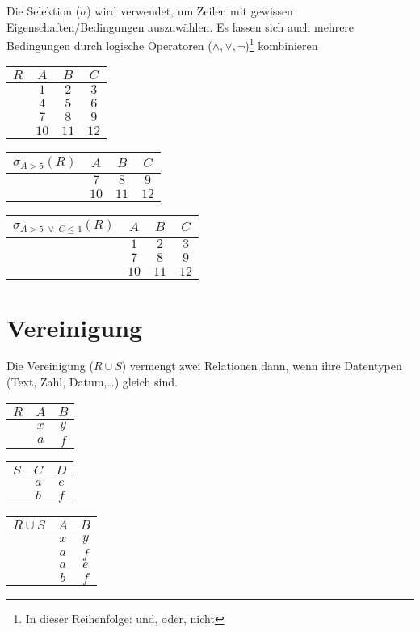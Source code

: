 \documentclass[12pt,a4paper,notitlepage,leqno]{article}
\begin{document}
Die Selektion ($\sigma$) wird verwendet, um Zeilen mit gewissen Eigenschaften/Bedingungen auszuwählen. Es lassen sich auch mehrere Bedingungen durch logische Operatoren ($\land, \lor, \neg$)\footnote{In dieser Reihenfolge: und, oder, nicht} kombinieren

\begin{center}
    \begin{tabular}{c|ccc}
        $R$ & $A$ & $B$ & $C$ \\\hline
         & $1$ & $2$ & $3$ \\
         & $4$ & $5$ & $6$ \\
         & $7$ & $8$ & $9$ \\
         & $10$ & $11$ & $12$
    \end{tabular}
    \hspace{1cm}
    \begin{tabular}{c|ccc}
        $\sigma_{A>5}(R)$ & $A$ & $B$ & $C$ \\\hline
         & $7$ & $8$ & $9$ \\
         & $10$ & $11$ & $12$
    \end{tabular}
    \hspace{1cm}
    \begin{tabular}{c|ccc}
        $\sigma_{A>5\;\lor\;C\leq 4}(R)$ & $A$ & $B$ & $C$ \\\hline
         & $1$ & $2$ & $3$ \\
         & $7$ & $8$ & $9$ \\
         & $10$ & $11$ & $12$
    \end{tabular}
\end{center}

\section*{Vereinigung}

Die Vereinigung ($R\cup S$) vermengt zwei Relationen dann, wenn ihre Datentypen (Text, Zahl, Datum,\dots) gleich sind.

\begin{center}
    \begin{tabular}{c|cc}
        $R$ & $A$ & $B$\\\hline
         & $x$ & $y$\\
         & $a$ & $f$\\
    \end{tabular}
    \hspace{1cm}
    \begin{tabular}{c|cc}
        $S$ & $C$ & $D$ \\\hline
         & $a$ & $e$\\
         & $b$ & $f$
    \end{tabular}
    \hspace{1cm}
    \begin{tabular}{c|cc}
        $R\cup S$ & $A$ & $B$ \\\hline
         & $x$ & $y$\\
         & $a$ & $f$\\
         & $a$ & $e$\\
         & $b$ & $f$
    \end{tabular}
\end{center}
\end{document}
